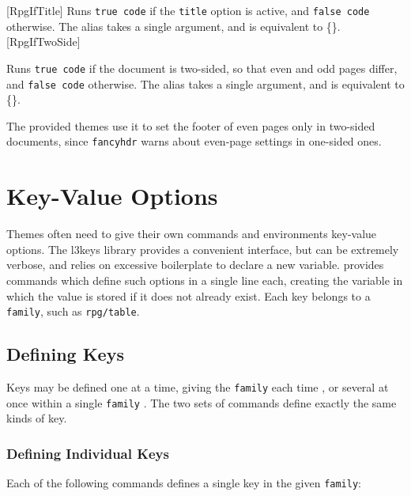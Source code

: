 		[RpgIfTitle]{}
		{
			Runs \texttt{true code} if the \texttt{title} option is active, and \texttt{false code} otherwise. The alias  takes a single argument, and is equivalent to \{\}.
		}
		[RpgIfTwoSide]{}
		{
			Runs \texttt{true code} if the document is two-sided, so that even and odd pages differ, and \texttt{false code} otherwise. The alias  takes a single argument, and is equivalent to \{\}.

			The provided themes use it to set the footer of even pages only in two-sided documents, since \texttt{fancyhdr} warns about even-page settings in one-sided ones.
		}

	\section{Key-Value Options}\label{S:ThemeKeys}

		Themes often need to give their own commands and environments key-value options. The l3keys library provides a convenient interface, but can be extremely verbose, and relies on excessive boilerplate to declare a new variable. \rpgtex{} provides commands which define such options in a single line each, creating the variable in which the value is stored if it does not already exist. Each key belongs to a \texttt{family}, such as \texttt{rpg/table}.

		\subsection{Defining Keys}

			Keys may be defined one at a time, giving the \texttt{family} each time , or several at once within a single \texttt{family} . The two sets of commands define exactly the same kinds of key.
			\subsubsection{Defining Individual Keys}\label{S:ThemeKeysSingle}

				Each of the following commands defines a single key in the given \texttt{family}:

